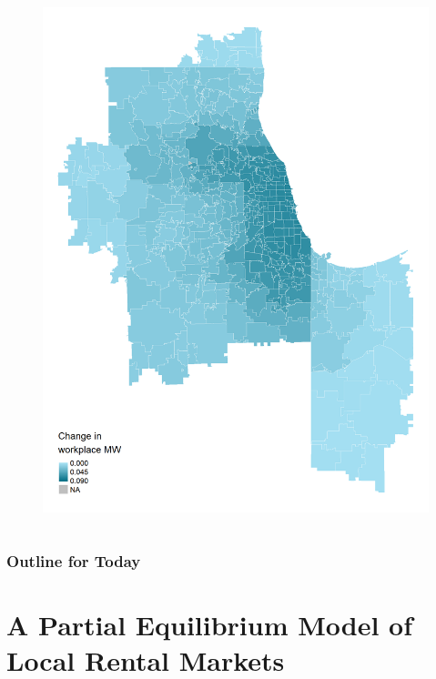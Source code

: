 \documentclass[aspectratio=169, t]{beamer}
\begin{document}
\begin{frame}[label = chi_example]
\begin{columns}
\begin{column}{0.50\textwidth}
\begin{figure}
                \includegraphics[scale = 0.36]{maps_events/output/chicago2019-6_wkp_mw.png}
            \end{figure}   
        \end{column}
    \end{columns}
    \hspace{6mm}
    \hyperlink{nyc_example}{} 
    \hyperlink{bay_example}{}
    \hyperlink{san_diego_example}{}
    \hyperlink{kc_example}{}
\end{frame}

\begin{frame}
    \frametitle{Outline for Today}
    \tableofcontents[hideallsubsections]
\end{frame}

\section{A Partial Equilibrium Model of Local Rental Markets}
\end{document}
